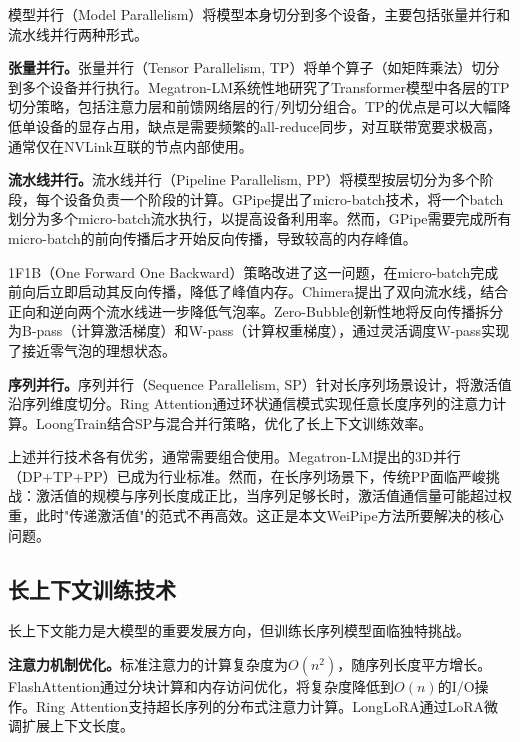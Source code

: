 模型并行（Model Parallelism）将模型本身切分到多个设备，主要包括张量并行和流水线并行两种形式。

\textbf{张量并行。}张量并行（Tensor Parallelism, TP）\cite{shoeybi2019megatron}将单个算子（如矩阵乘法）切分到多个设备并行执行。Megatron-LM\cite{shoeybi2019megatron}系统性地研究了Transformer模型中各层的TP切分策略，包括注意力层和前馈网络层的行/列切分组合。TP的优点是可以大幅降低单设备的显存占用，缺点是需要频繁的all-reduce同步，对互联带宽要求极高，通常仅在NVLink互联的节点内部使用。

\textbf{流水线并行。}流水线并行（Pipeline Parallelism, PP）\cite{gpipe,huang2019gpipe}将模型按层切分为多个阶段，每个设备负责一个阶段的计算。GPipe\cite{gpipe}提出了micro-batch技术，将一个batch划分为多个micro-batch流水执行，以提高设备利用率。然而，GPipe需要完成所有micro-batch的前向传播后才开始反向传播，导致较高的内存峰值。

1F1B（One Forward One Backward）\cite{harlap2018pipedream}策略改进了这一问题，在micro-batch完成前向后立即启动其反向传播，降低了峰值内存。Chimera\cite{li2021chimera}提出了双向流水线，结合正向和逆向两个流水线进一步降低气泡率。Zero-Bubble\cite{qi2024zerobubble}创新性地将反向传播拆分为B-pass（计算激活梯度）和W-pass（计算权重梯度），通过灵活调度W-pass实现了接近零气泡的理想状态。

\textbf{序列并行。}序列并行（Sequence Parallelism, SP）\cite{li2022sequence}针对长序列场景设计，将激活值沿序列维度切分。Ring Attention\cite{liu2023ring}通过环状通信模式实现任意长度序列的注意力计算。LoongTrain\cite{gu2024loongtrain}结合SP与混合并行策略，优化了长上下文训练效率。

上述并行技术各有优劣，通常需要组合使用。Megatron-LM提出的3D并行（DP+TP+PP）已成为行业标准\cite{narayanan2021efficient}。然而，在长序列场景下，传统PP面临严峻挑战：激活值的规模与序列长度成正比，当序列足够长时，激活值通信量可能超过权重，此时"传递激活值"的范式不再高效。这正是本文WeiPipe方法所要解决的核心问题。

\subsection{长上下文训练技术}

长上下文能力是大模型的重要发展方向，但训练长序列模型面临独特挑战。

\textbf{注意力机制优化。}标准注意力的计算复杂度为$O(n^2)$，随序列长度平方增长。FlashAttention\cite{dao2023flashattention,dao2023flashattention2}通过分块计算和内存访问优化，将复杂度降低到$O(n)$的I/O操作。Ring Attention\cite{liu2023ring}支持超长序列的分布式注意力计算。LongLoRA\cite{chen2023longlora}通过LoRA微调扩展上下文长度。

